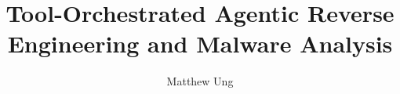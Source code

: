 \documentclass[MS]{inithesis}
\author{Matthew Ung}
\title{Tool-Orchestrated Agentic Reverse Engineering and Malware Analysis}
\begin{document}


\maketitle



\clearpage

\tableofcontents
\newpage
%











\cleardoublepage
\normalbaselines



\appendix

\end{document}
